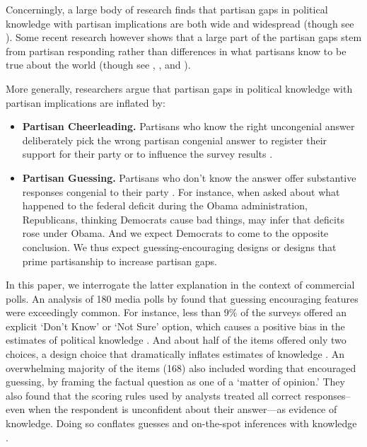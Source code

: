 \documentclass[12pt, letterpaper]{article}
\begin{document}
Concerningly, a large body of research finds that partisan gaps in political knowledge with partisan implications are both wide and widespread \citep{bartels_2002, jerit2012partisan, pew2018disagree, lodgetaber_2013} (though see \citet{roush2023}). Some recent research however shows that a large part of the partisan gaps stem from partisan responding rather than differences in what partisans know to be true about the world \citep{bullocketal_2015, prior2015you, huber_yair_2018, graham2023less} (though see \citet{peterson2021partisan}, \citet{berinsky_2017}, and \citet{malka2022expressive}). 

More generally, researchers argue that partisan gaps in political knowledge with partisan implications are inflated by: 

\begin{itemize}

    \item \textbf{Partisan Cheerleading.} Partisans who know the right uncongenial answer deliberately pick the wrong partisan congenial answer to register their support for their party or to influence the survey results \citep{prior2015you}.

    \item \textbf{Partisan Guessing.} Partisans who don't know the answer offer substantive responses congenial to their party \citep{bullocketal_2015, graham2023less}. For instance, when asked about what happened to the federal deficit during the Obama administration, Republicans, thinking Democrats cause bad things, may infer that deficits rose under Obama. And we expect Democrats to come to the opposite conclusion. We thus expect guessing-encouraging designs or designs that prime partisanship to increase partisan gaps.

\end{itemize}

In this paper, we interrogate the latter explanation in the context of commercial polls. An analysis of 180 media polls by \citet{luskinetal_nd} found that guessing encouraging features were exceedingly common. For instance, less than 9\% of the surveys offered an explicit `Don't Know' or `Not Sure' option, which causes a positive bias in the estimates of political knowledge \citep{luskin2011don}. And about half of the items offered only two choices, a design choice that dramatically inflates estimates of knowledge \citep{bullock2022response}. An overwhelming majority of the items (168) also included wording that encouraged guessing, by framing the factual question as one of a `matter of opinion.' They also found that the scoring rules used by analysts treated all correct responses--even when the respondent is unconfident about their answer---as evidence of knowledge. Doing so conflates guesses and on-the-spot inferences with knowledge \citep{pasek2015}. 
\end{document}
